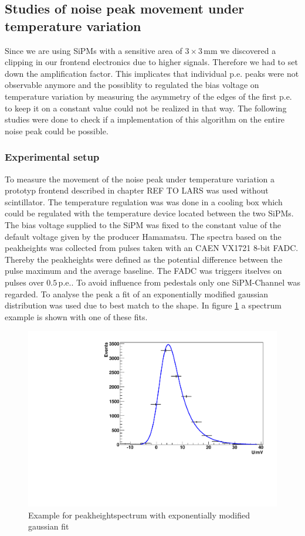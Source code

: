 \subsection{Studies of noise peak movement under temperature variation}
\label{sipmNoiseMovement}
Since we are using SiPMs with a sensitive area of $3\times3\,\mathrm{mm}$ we discovered a clipping in our frontend electronics due to higher signals. Therefore we had to set down the amplification factor. This implicates that individual p.e. peaks were not observable anymore and the possiblity to regulated the bias voltage on temperature variation by measuring the asymmetry of the edges of the first p.e. to keep it on a constant value could not be realized in that way. The following studies were done to check if a implementation of this algorithm on the entire noise peak could be possible.

\subsubsection{Experimental setup}
To measure the movement of the noise peak under temperature variation a prototyp frontend described in chapter REF TO LARS was used without scintillator.
The temperature regulation was was done in a cooling box which could be regulated with the temperature device located between the two SiPMs. The bias voltage supplied to the SiPM was fixed to the constant value of the default voltage given by the producer Hamamatsu. The spectra based on the peakheights was collected from pulses taken with an CAEN VX1721 8-bit FADC. Thereby the peakheights were defined as the potential difference between the pulse maximum and the average baseline. 
The FADC was triggers itselves on pulses over $0.5\,\mathrm{p.e.}$. To avoid influence from pedestals only one SiPM-Channel was regarded. To analyse the peak a fit of an exponentially modified gaussian distribution was used due to best match to the shape. In figure \ref{NoiseMoveExample} a spectrum example is shown with one of these fits.
\begin{figure}[h]
	\centering
	\includegraphics[width = .65\textwidth]{Figures/radermacher/NoiseMovementExample.pdf}
	\caption{Example for peakheightspectrum with exponentially modified gaussian fit}
	\label{NoiseMoveExample}
\end{figure}
